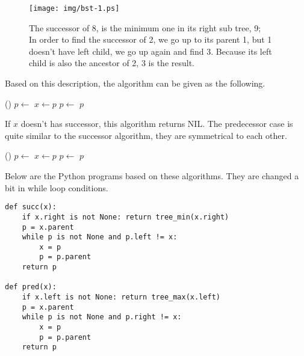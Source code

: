 \documentclass{article}
\begin{document}
\begin{figure}[htbp]
  \centering
  \texttt{[image: img/bst-1.ps]}
  \caption{The successor of 8, is the minimum one in its right sub tree, 9; \\
           In order to find the successor of 2, we go up to its parent 1, but 1 doesn't have left child, we go up again and find 3. Because its left child is also the ancestor of 2, 3 is the result.} \label{fig:bst-succ}
\end{figure}

Based on this description, the algorithm can be given as the following.

\begin{algorithmic}[1]
    \State \Return {}()
  \Else
    \State $p \gets $ 
      \State $x \gets p$
      \State $p \gets $ 
    \EndWhile
    \State \Return $p$
  \EndIf
\EndFunction
\end{algorithmic}

If $x$ doesn't has successor, this algorithm returns NIL.
The predecessor case is quite similar to the successor algorithm, they
are symmetrical to each other.

\begin{algorithmic}[1]
    \State \Return {}()
  \Else
    \State $p \gets $ 
      \State $x \gets p$
      \State $p \gets $ 
    \EndWhile
    \State \Return $p$
  \EndIf
\EndFunction
\end{algorithmic}

Below are the Python programs based on these algorithms. They are changed
a bit in while loop conditions.

\lstset{language=Python}
\begin{lstlisting}
def succ(x):
    if x.right is not None: return tree_min(x.right)
    p = x.parent
    while p is not None and p.left != x:
        x = p
        p = p.parent
    return p

def pred(x):
    if x.left is not None: return tree_max(x.left)
    p = x.parent
    while p is not None and p.right != x:
        x = p
        p = p.parent
    return p
\end{lstlisting}
\end{document}
